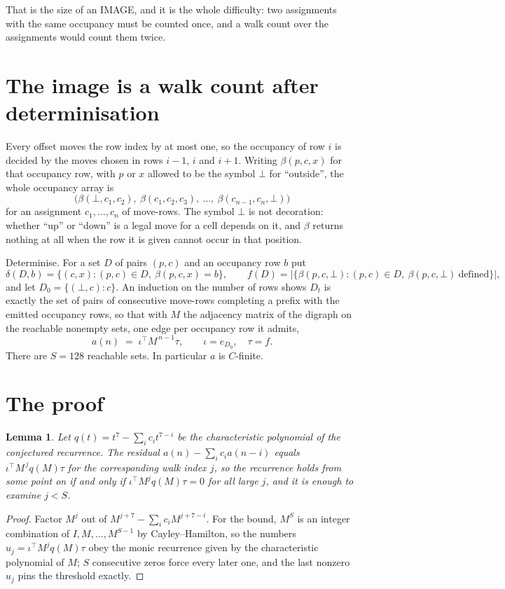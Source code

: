 \documentclass[11pt,a4paper]{article}
\theoremstyle{plain}
\newtheorem{lemma}[theorem]{Lemma}
\theoremstyle{definition}
\begin{document}
That is the size of an IMAGE, and it is the whole difficulty: two assignments with the same
occupancy must be counted once, and a walk count over the assignments would count them twice.

\section{The image is a walk count after determinisation}

Every offset moves the row index by at most one, so the occupancy of row $i$ is decided by the
moves chosen in rows $i-1$, $i$ and $i+1$. Writing $\beta(p,c,x)$ for that occupancy row, with
$p$ or $x$ allowed to be the symbol $\bot$ for ``outside'', the whole occupancy array is
\[
\bigl(\beta(\bot,c_1,c_2),\ \beta(c_1,c_2,c_3),\ \dots,\ \beta(c_{n-1},c_n,\bot)\bigr)
\]
for an assignment $c_1,\dots,c_n$ of move-rows. The symbol $\bot$ is not decoration: whether
``up'' or ``down'' is a legal move for a cell depends on it, and $\beta$ returns nothing at all
when the row it is given cannot occur in that position.

Determinise. For a set $D$ of pairs $(p,c)$ and an occupancy row $b$ put
\[
\delta(D,b)=\{(c,x):(p,c)\in D,\ \beta(p,c,x)=b\},\qquad
f(D)=\bigl|\{\beta(p,c,\bot):(p,c)\in D,\ \beta(p,c,\bot)\ \text{defined}\}\bigr| ,
\]
and let $D_0=\{(\bot,c):c\}$. An induction on the number of rows shows $D_t$ is exactly the
set of pairs of consecutive move-rows completing a prefix with the emitted occupancy rows, so
that with $M$ the adjacency matrix of the digraph on the reachable nonempty sets, one edge per
occupancy row it admits,
\[
a(n)\;=\;\iota^{\!\top}M^{\,n-1}\tau,\qquad \iota=e_{D_0},\quad \tau=f .
\]
There are $S=128$ reachable sets. In particular $a$ is $C$-finite.

\section{The proof}

\begin{lemma}\label{lem:crit}
Let $q(t)=t^{7}-\sum_i c_it^{7-i}$ be the characteristic polynomial of the
conjectured recurrence. The residual $a(n)-\sum_ic_ia(n-i)$ equals
$\iota^{\!\top}M^{\,j}q(M)\tau$ for the corresponding walk index $j$, so the recurrence
holds from some point on if and only if $\iota^{\!\top}M^{j}q(M)\tau=0$ for all large $j$,
and it is enough to examine $j<S$.
\end{lemma}

\begin{proof}
Factor $M^{j}$ out of $M^{j+7}-\sum_ic_iM^{j+7-i}$. For the bound, $M^{S}$
is an integer combination of $I,M,\dots,M^{S-1}$ by Cayley--Hamilton, so the numbers
$u_j=\iota^{\!\top}M^{j}q(M)\tau$ obey the monic recurrence given by the characteristic
polynomial of $M$; $S$ consecutive zeros force every later one, and the last nonzero $u_j$
pins the threshold exactly.
\end{proof}
\end{document}
